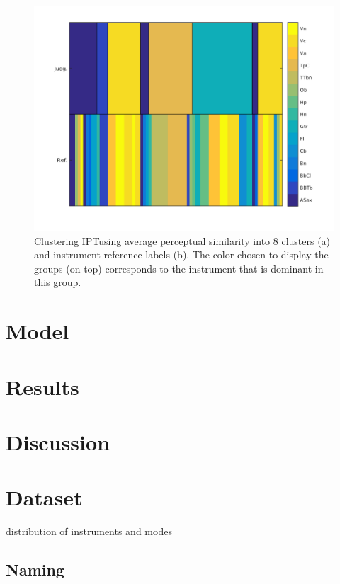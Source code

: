 \documentclass{article}
\newcommand{\ipt}{IPT}
\begin{document}
\begin{figure}
\center
\includegraphics[width = \textwidth]{figures/groupInstruments.png}
\caption{Clustering \ipt using average perceptual similarity into 8 clusters (a) and instrument reference labels (b). The color chosen to display the groups (on top) corresponds  to the instrument that is dominant in this group.}
\label{fig:gi}
\end{figure}

\section{Model}\label{sec:model}

\section{Results}\label{sec:results}

\section{Discussion}\label{sec:discussion}






\section{Dataset}

distribution of instruments and modes

\subsection{Naming}
\end{document}
